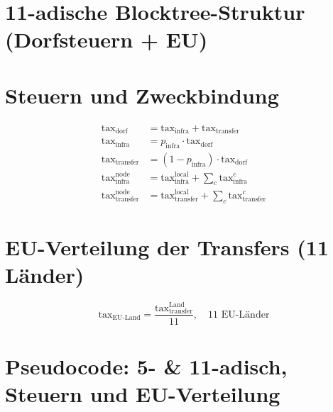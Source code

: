 \documentclass[a4paper,12pt]{article}
\begin{document}
\section{11-adische Blocktree-Struktur (Dorfsteuern + EU)}

\begin{center}
\end{center}

\section{Steuern und Zweckbindung}

\begin{align*}
\text{tax}_\text{dorf} &= \text{tax}_\text{infra} + \text{tax}_\text{transfer} \\
\text{tax}_\text{infra} &= p_\text{infra} \cdot \text{tax}_\text{dorf} \\
\text{tax}_\text{transfer} &= (1 - p_\text{infra}) \cdot \text{tax}_\text{dorf} \\
\text{tax}_\text{infra}^{\text{node}} &= \text{tax}_\text{infra}^{\text{local}} + \sum_{c} \text{tax}_\text{infra}^c \\
\text{tax}_\text{transfer}^{\text{node}} &= \text{tax}_\text{transfer}^{\text{local}} + \sum_{c} \text{tax}_\text{transfer}^c
\end{align*}

\section{EU-Verteilung der Transfers (11 Länder)}

\[
\text{tax}_\text{EU-Land} = \frac{\text{tax}_\text{transfer}^{\text{Land}}}{11}, \quad 11 \text{ EU-Länder}
\]

\section{Pseudocode: 5- & 11-adisch, Steuern und EU-Verteilung}
\end{document}
